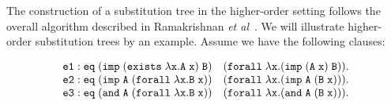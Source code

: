 \documentclass{llncs}
\newcommand{\typeLF}{\tt{type}}
\newcommand{\propLF}{\tt{prop}}
\newcommand{\andLF}{\tt{and}\;}
\newcommand{\impLF}{\tt{imp}\;}
\newcommand{\forallLF}{\tt{forall}\;}
\newcommand{\existsLF}{\tt{exists}\;}
\newcommand{\eqLF}{\tt{eq}\;}
\newcommand{\eqilLF}{\tt{e1}}
\newcommand{\eqirLF}{\tt{e2}}
\newcommand{\eqalLF}{\tt{e3}}
\begin{document}
The construction of a
substitution tree in the higher-order setting follows the overall
algorithm described in Ramakrishnan {\em et
al}~\cite{Ramakrishnan01:indexing}. We will illustrate higher-order
substitution trees by an example. Assume we have the following clauses:
\begin{small}
\[
\begin{array}{l}
%
\eqilLF: \eqLF (\impLF (\existsLF \lambda x. A\; x)\; B)\quad (\forallLF \lambda x. (\impLF (A\; x)\; B)).\\
\eqirLF: \eqLF (\impLF A\; (\forallLF \lambda x. B\;x)) \quad (\forallLF \lambda x. (\impLF A \; (B\; x))).\\
\eqalLF: \eqLF (\andLF A \; (\forallLF \lambda x. B\; x)) \quad (\forallLF \lambda x. (\andLF A \; (B\;x))).\\
\end{array}
\]
\end{small}
\end{document}
